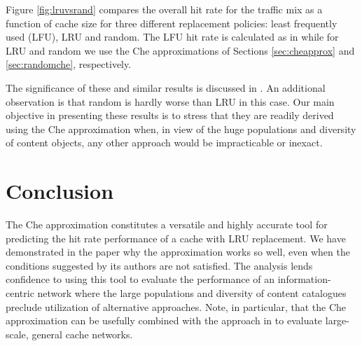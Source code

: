\documentclass{amsart}
\begin{document}
Figure \ref{fig:lruvsrand} compares the overall hit rate for the traffic mix as a function of cache size for three different replacement policies: least frequently used (LFU),  LRU and random. The LFU hit rate is calculated as in \cite{FRRS12} while for LRU and random we use the Che approximations of Sections \ref{sec:cheapprox} and \ref{sec:randomche}, respectively. 

The significance of these and similar results is discussed in \cite{FRRS12}. An additional observation is that random is hardly worse than LRU in this case. Our main objective in presenting these results is to stress that they are readily derived using the Che approximation when, in view of the huge populations and diversity of content objects, any other approach would be impracticable or inexact.


 \section{Conclusion}

The Che approximation constitutes a versatile and highly accurate tool for predicting the hit rate performance of a cache with LRU replacement. We have demonstrated in the paper why the approximation works so well, even when the conditions suggested by its authors are not satisfied. The analysis lends confidence to using this tool to evaluate the performance of an information-centric network where the large populations and diversity of content catalogues preclude utilization of alternative approaches. Note, in particular, that the Che approximation can be usefully combined with the approach in \cite{RKT2010} to evaluate large-scale, general cache networks.
\end{document}
